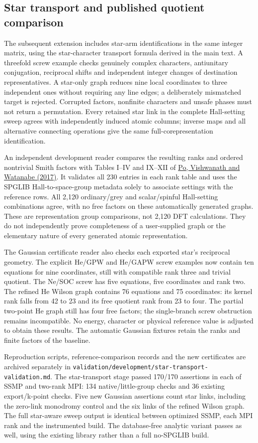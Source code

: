 \documentclass[11pt]{article}
\begin{document}
\subsection{Star transport and published quotient comparison}
The subsequent extension includes star-arm identifications in the
same integer matrix, using the star-character transport formula
derived in the main text. A threefold screw example checks genuinely complex
characters, antiunitary conjugation, reciprocal shifts and independent
integer changes of destination representatives. A star-only graph
reduces nine local coordinates to three independent ones without
requiring any line edges; a deliberately mismatched target is rejected.
Corrupted factors, nonfinite characters and unsafe phases must not
return a permutation. Every retained star link in the complete
Hall-setting sweep agrees with independently induced atomic columns;
inverse maps and all alternative connecting operations give the same
full-corepresentation identification.

An independent development reader compares the resulting ranks and
ordered nontrivial Smith factors with Tables I--IV and IX--XII of
\href{https://arxiv.org/abs/1703.00911v2}{Po, Vishwanath and Watanabe (2017)}.
It validates all 230 entries in each rank table
and uses the SPGLIB Hall-to-space-group metadata solely to associate
settings with the reference rows. All 2,120 ordinary/grey and
scalar/spinful Hall-setting combinations agree, with no free factors
on these automatically generated graphs. These are representation
group comparisons, not 2,120 DFT calculations. They do not independently
prove completeness of a user-supplied graph or the elementary nature
of every generated atomic representation.

The Gaussian certificate reader also checks each exported star's
reciprocal geometry. The explicit He/GPW and He/GAPW screw examples
now contain ten equations for nine coordinates, still with compatible
rank three and trivial quotient. The Ne/SOC screw has five equations,
five coordinates and rank two. The refined He Wilson graph contains
76 equations and 75 coordinates: its kernel rank falls from 42 to 23
and its free quotient rank from 23 to four. The partial two-point He
graph still has four free factors; the single-branch screw obstruction
remains incompatible. No energy, character or physical reference value
is adjusted to obtain these results. The automatic Gaussian fixtures
retain the ranks and finite factors of the baseline.

Reproduction scripts, reference-comparison records and the new
certificates are archived separately in
\texttt{validation/development/star-transport-validation.md}.
The star-transport stage passed 170/170 assertions in each of
SSMP and two-rank MPI: 134 native/little-group checks and 36
existing export/k-point checks. Five new Gaussian assertions count
star links, including the zero-link monodromy control and the six
links of the refined Wilson graph.
The full star-aware sweep output is identical between optimized SSMP,
each MPI rank and the instrumented build. The database-free analytic
variant passes as well, using the existing library rather than a full
no-SPGLIB build.
\end{document}
